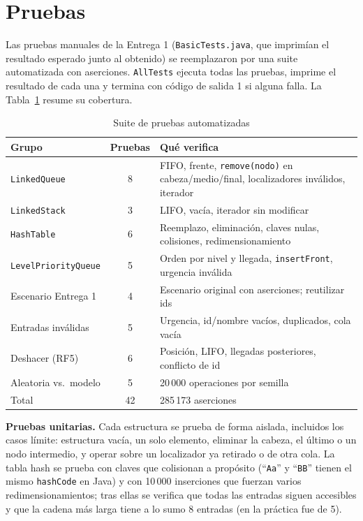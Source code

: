 \section{Pruebas}
\label{sec:pruebas}

Las pruebas manuales de la Entrega 1 (\texttt{BasicTests.java}, que
imprimían el resultado esperado junto al obtenido) se reemplazaron por una
suite automatizada con aserciones. \texttt{AllTests} ejecuta todas las
pruebas, imprime el resultado de cada una y termina con código de salida 1
si alguna falla. La Tabla~\ref{tab:pruebas} resume su cobertura.

\begin{table}[t]
  \caption{Suite de pruebas automatizadas}
  \label{tab:pruebas}
  \centering
  \footnotesize
  \begin{tabular}{p{}cp{}}
    \toprule
    Grupo & Pruebas & Qué verifica \\
    \midrule
    \texttt{LinkedQueue} & 8 & FIFO, frente, \texttt{remove(nodo)} en cabeza/medio/final, localizadores inválidos, iterador \\
    \texttt{LinkedStack} & 3 & LIFO, vacía, iterador sin modificar \\
    \texttt{HashTable} & 6 & Reemplazo, eliminación, claves nulas, colisiones, redimensionamiento \\
    \texttt{LevelPriorityQueue} & 5 & Orden por nivel y llegada, \texttt{insertFront}, urgencia inválida \\
    Escenario Entrega 1 & 4 & Escenario original con aserciones; reutilizar ids \\
    Entradas inválidas & 5 & Urgencia, id/nombre vacíos, duplicados, cola vacía \\
    Deshacer (RF5) & 6 & Posición, LIFO, llegadas posteriores, conflicto de id \\
    Aleatoria vs.\ modelo & 5 & 20\,000 operaciones por semilla \\
    \midrule
    Total & 42 & 285\,173 aserciones \\
    \bottomrule
  \end{tabular}
\end{table}

\textbf{Pruebas unitarias.} Cada estructura se prueba de forma aislada,
incluidos los casos límite: estructura vacía, un solo elemento, eliminar
la cabeza, el último o un nodo intermedio, y operar sobre un localizador
ya retirado o de otra cola. La tabla hash se prueba con claves que
colisionan a propósito (``\texttt{Aa}'' y ``\texttt{BB}'' tienen el mismo
\texttt{hashCode} en Java) y con 10\,000 inserciones que fuerzan varios
redimensionamientos; tras ellas se verifica que todas las entradas siguen
accesibles y que la cadena más larga tiene a lo sumo 8 entradas (en la
práctica fue de 5).

